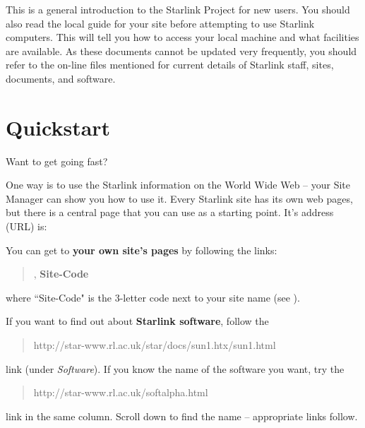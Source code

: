 This is a general introduction to the Starlink Project for new users.
You should also read the local guide for your site before attempting to use
Starlink computers.
This will tell you how to access your local machine and what facilities are
available.
As these documents cannot be updated very frequently, you should refer to the
on-line files mentioned for current details of Starlink staff, sites,
documents, and software.
 \newpage
 \begin{latexonly}
   \setlength{\parskip}{0mm}
   \latexonlytoc
   \setlength{\parskip}{\medskipamount}
 \end{latexonly}
\newpage
\renewcommand{\thepage}{\arabic{page}}
\setcounter{page}{1}

\section{Quickstart}

Want to get going fast?

One way is to use the Starlink information on the World Wide Web -- your
Site Manager can show you how to use it.
Every Starlink site has its own web pages, but there is a central page that
you can use as a starting point.
It's address (URL) is:
\begin{quote}
\end{quote}
You can get to {\bf your own site's pages} by following the links:
\begin{quote}
,
{\bf Site-Code}
\end{quote}
where ``Site-Code" is the 3-letter code next to your site name
(see ).

If you want to find out about {\bf Starlink software}, follow the
\begin{quote}
{http://star-www.rl.ac.uk/star/docs/sun1.htx/sun1.html}
\end{quote}
link (under {\em Software}).
If you know the name of the software you want, try the
\begin{quote}
{http://star-www.rl.ac.uk/softalpha.html}
\end{quote}
link in the same column.
Scroll down to find the name -- appropriate links follow.

